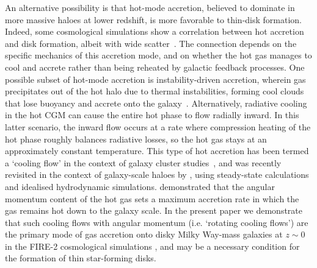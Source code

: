 \documentclass[fleqn,usenatbib]{mnras}
\begin{document}
An alternative possibility is that hot-mode accretion, believed to dominate in more massive haloes at lower redshift, is more favorable to thin-disk formation.
Indeed, some cosmological simulations show a correlation between hot accretion and disk formation, albeit with wide scatter~\citep{Sales2012}.
The connection depends on the specific mechanics of this accretion mode, and on whether the hot gas manages to cool and accrete rather than being reheated by galactic feedback processes.
One possible subset of hot-mode accretion is instability-driven accretion, wherein gas precipitates out of the hot halo due to thermal instabilities, forming cool clouds that lose buoyancy and accrete onto the galaxy~\citep[e.g.][]{Maller2004, Mccourt2012, Voit2015, Armillotta2016, Gronke2020b,Fielding2020, Voit2021}.
Alternatively, radiative cooling in the hot CGM can cause the entire hot phase to flow radially inward.
In this latter scenario, the inward flow occurs at a rate where compression heating of the hot phase roughly balances radiative losses, so the hot gas stays at an approximately constant temperature.
This type of hot accretion has been termed a `cooling flow' in the context of galaxy cluster studies~\citep[][see \citealt{McNamara2007} for a review]{Mathews1978, Cowie1980, Fabian1984, Balbus1988, Bertschinger1989}, and was recently revisited in the context of galaxy-scale haloes by \cite{Stern2019,Stern2020}, using steady-state calculations and idealised hydrodynamic simulations. 
\cite{Stern2020} demonstrated that the angular momentum content of the hot gas sets a maximum accretion rate in which the gas remains hot down to the galaxy scale. 
In the present paper we demonstrate that such cooling flows with angular momentum (i.e. `rotating cooling flows')
are the primary mode of gas accretion onto disky Milky Way-mass galaxies at $z \sim 0$ in the FIRE-2 cosmological simulations \citep{Hopkins2018}, and may be a necessary condition for the formation of thin star-forming disks.
\end{document}

